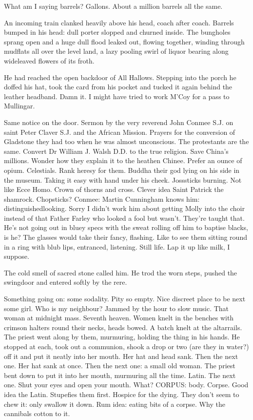 What am I saying barrels? Gallons. About a million barrels all the same.

An incoming train clanked heavily above his head, coach after coach.
Barrels bumped in his head: dull porter slopped and churned inside. The
bungholes sprang open and a huge dull flood leaked out, flowing together,
winding through mudflats all over the level land, a lazy pooling swirl of
liquor bearing along wideleaved flowers of its froth.

He had reached the open backdoor of All Hallows. Stepping into the
porch he doffed his hat, took the card from his pocket and tucked it again
behind the leather headband. Damn it. I might have tried to work M'Coy
for a pass to Mullingar.

Same notice on the door. Sermon by the very reverend John Conmee
S.J. on saint Peter Claver S.J. and the African Mission. Prayers for the
conversion of Gladstone they had too when he was almost unconscious.
The protestants are the same. Convert Dr William J. Walsh D.D. to the
true religion. Save China's millions. Wonder how they explain it to the
heathen Chinee. Prefer an ounce of opium. Celestials. Rank heresy for
them. Buddha their god lying on his side in the museum. Taking it easy
with hand under his cheek. Josssticks burning. Not like Ecce Homo. Crown
of thorns and cross. Clever idea Saint Patrick the shamrock. Chopsticks?
Conmee: Martin Cunningham knows him: distinguishedlooking. Sorry I
didn't work him about getting Molly into the choir instead of that Father
Farley who looked a fool but wasn't. They're taught that. He's not going
out in bluey specs with the sweat rolling off him to baptise blacks, is
he? The glasses would take their fancy, flashing. Like to see them sitting
round in a ring with blub lips, entranced, listening. Still life. Lap it
up like milk, I suppose.


The cold smell of sacred stone called him. He trod the worn steps,
pushed the swingdoor and entered softly by the rere.

Something going on: some sodality. Pity so empty. Nice discreet place
to be next some girl. Who is my neighbour? Jammed by the hour to slow
music. That woman at midnight mass. Seventh heaven. Women knelt in the
benches with crimson halters round their necks, heads bowed. A batch knelt
at the altarrails. The priest went along by them, murmuring, holding the
thing in his hands. He stopped at each, took out a communion, shook a
drop or two (are they in water?) off it and put it neatly into her mouth.
Her hat and head sank. Then the next one. Her hat sank at once. Then the
next one: a small old woman. The priest bent down to put it into her
mouth, murmuring all the time. Latin. The next one. Shut your eyes and
open your mouth. What? CORPUS: body. Corpse. Good idea the Latin.
Stupefies them first. Hospice for the dying. They don't seem to chew it:
only swallow it down. Rum idea: eating bits of a corpse. Why the cannibals
cotton to it.

